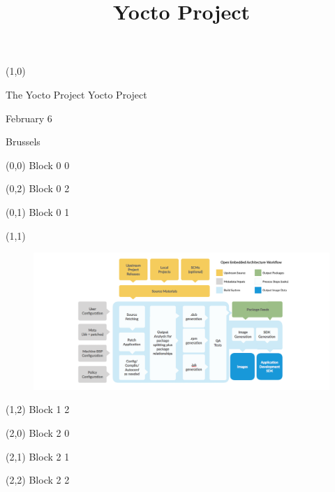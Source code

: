 \documentclass{beamer}
\title{Yocto Project}
\begin{document}
\begin{textblock}{1}(1,0)
\fontsize{32}{36}\selectfont
\begin{block}{The Yocto Project}
Yocto Project

February 6

Brussels

\end{block}
\end{textblock}

\begin{textblock}{1}(0,0)
\huge
Block 0 0
\end{textblock}


\begin{textblock}{1}(0,2)
\huge
Block 0 2
\end{textblock}

\begin{textblock}{.5}(0,1)
\huge
Block 0 1
\end{textblock}

\begin{textblock}{2}(1,1)
\huge
	\begin{block}{}
	\begin{figure}
	\centering
	\includegraphics[scale=1.5]{yp-how-it-works-new-diagram}
	\end{figure}
	\end{block}
\end{textblock}

\begin{textblock}{1}(1,2)
\huge
Block 1 2
\end{textblock}

\begin{textblock}{1}(2,0)
\huge
Block 2 0
\end{textblock}

\begin{textblock}{1}(2,1)
\huge
Block 2 1
\end{textblock}

\begin{textblock}{1}(2,2)
\huge
Block 2 2
\end{textblock}

%
\end{document}
